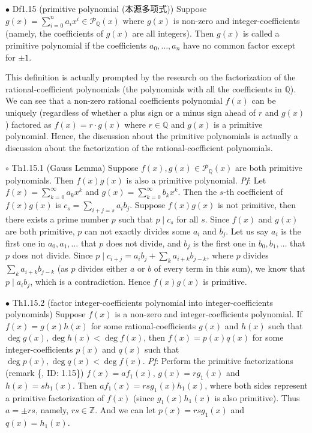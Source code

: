 \documentclass{article}
\begin{document}
\begin{Df}{$\bullet$ Df1.15 (primitive polynomial (本源多项式))}
    Suppose $g(x)=\sum_{i=0}^{n} a_ix^i\in\mathcal{P}_\mathbb{\mathbb{Q}}(x)$ where $g(x)$ is non-zero and integer-coefficients (namely, the coefficients of $g(x)$ are all integers). Then $g(x)$ is called a primitive polynomial if the coefficients $a_0, \dots, a_n$ have no common factor except for $\pm 1$.
\end{Df}

\begin{Rmk}{}
    This definition is actually prompted by the research on the factorization of \textcolor{Df}{the rational-coefficient polynomials (the polynomials with all the coefficients in $\mathbb{Q}$)}. We can see that \textcolor{Th}{a non-zero rational coefficients polynomial $f(x)$ can be uniquely (regardless of whether a plus sign or a minus sign ahead of $r$ and $g(x)$) factored as $f(x) = r\cdot g(x)$ where $r\in\mathbb{Q}$ and $g(x)$ is a primitive polynomial.} Hence, the discussion about the primitive polynomials is actually a discussion about the factorization of the rational-coefficient polynomials.
\end{Rmk}

\begin{Th}{$\circ$ Th1.15.1 (Gauss Lemma)}
    Suppose $f(x), g(x)\in\mathcal{P}_\mathbb{\mathbb{Q}}(x)$ are both primitive polynomials. Then $f(x)g(x)$ is also a primitive polynomial.
    \tcblower
    \textit{Pf}: Let $f(x) = \sum_{k=0}^{\infty} a_kx^k$ and $g(x) = \sum_{k=0}^{\infty} b_kx^k$. Then the $s$-th coefficient of $f(x)g(x)$ is $c_s = \sum_{i+j = s} a_ib_{j}$. Suppose $f(x)g(x)$ is not primitive, then there exists a prime number $p$ such that $p\mid c_s$ for all $s$. Since $f(x)$ and $g(x)$ are both primitive, $p$ can not exactly divides some $a_i$ and $b_j$. Let us say $a_i$ is the first one in $a_0, a_1, \dots$ that $p$ does not divide, and $b_j$ is the first one in $b_0, b_1, \dots$ that $p$ does not divide. Since $p\mid c_{i+j} = a_ib_j+\sum_{k}a_{i+k}b_{j-k}$, where $p$ divides $\sum_{k}a_{i+k}b_{j-k}$ (as $p$ divides either $a$ or $b$ of every term in this sum), we know that $p\mid a_ib_j$, which is a contradiction. Hence $f(x)g(x)$ is primitive.
\end{Th}

\begin{Th}{$\bullet$ Th1.15.2 (factor integer-coefficients polynomial into integer-coefficients polynomials)}
    Suppose $f(x)$ is a non-zero and integer-coefficients polynomial. If $f(x) = g(x)h(x)$ for some rational-coefficients $g(x)$ and $h(x)$ such that $\deg g(x), \deg h(x)<\deg f(x)$, then $f(x) = p(x)q(x)$ for some integer-coefficients $p(x)$ and $q(x)$ such that $\deg p(x), \deg q(x)<\deg f(x)$.
    \tcblower
    \textit{Pf}: Perform the primitive factorizations (remark \{, ID: 1.15\}) $f(x) = af_1(x)$, $g(x) = rg_1(x)$ and $h(x) = sh_1(x)$. Then $af_1(x) = rsg_1(x)h_1(x)$, where both sides represent a primitive factorization of $f(x)$ (since $g_1(x)h_1(x)$ is also primitive). Thus $a = \pm rs$, namely, $rs\in\mathbb{Z}$. And we can let $p(x) = rsg_1(x)$ and $q(x) = h_1(x)$. 
\end{Th}
\end{document}
